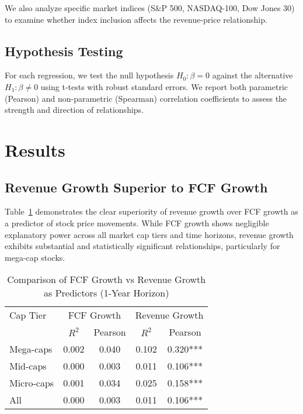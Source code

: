 \documentclass[11pt]{article}
\begin{document}
We also analyze specific market indices (S\&P 500, NASDAQ-100, Dow Jones 30) to examine whether index inclusion affects the revenue-price relationship.

\subsection{Hypothesis Testing}

For each regression, we test the null hypothesis $H_0: \beta = 0$ against the alternative $H_1: \beta \neq 0$ using t-tests with robust standard errors. We report both parametric (Pearson) and non-parametric (Spearman) correlation coefficients to assess the strength and direction of relationships.

\section{Results}

\subsection{Revenue Growth Superior to FCF Growth}

Table~\ref{tab:fcf-vs-revenue} demonstrates the clear superiority of revenue growth over FCF growth as a predictor of stock price movements. While FCF growth shows negligible explanatory power across all market cap tiers and time horizons, revenue growth exhibits substantial and statistically significant relationships, particularly for mega-cap stocks.

\begin{table}[!htbp]
\centering
\caption{Comparison of FCF Growth vs Revenue Growth as Predictors (1-Year Horizon)}
\label{tab:fcf-vs-revenue}
\begin{tabular}{lcccc}
\toprule
Cap Tier & \multicolumn{2}{c}{FCF Growth} & \multicolumn{2}{c}{Revenue Growth} \\
\cmidrule(r){2-3} \cmidrule(l){4-5}
 & $R^2$ & Pearson & $R^2$ & Pearson \\
\midrule
Mega-caps & 0.002 & 0.040 & 0.102 & 0.320*** \\
Mid-caps  & 0.000 & 0.003 & 0.011 & 0.106*** \\
Micro-caps & 0.001 & 0.034 & 0.025 & 0.158*** \\
All & 0.000 & 0.003 & 0.011 & 0.106*** \\
\bottomrule
\end{tabular}
\end{table}
\end{document}
